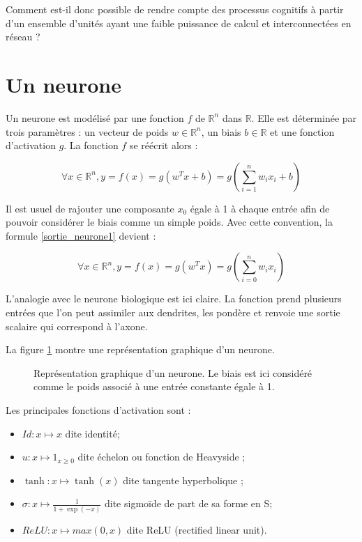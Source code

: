 \documentclass{report}
\begin{document}
Comment est-il donc possible de rendre compte des processus cognitifs à partir d'un ensemble d'unités ayant une faible puissance de calcul et interconnectées en réseau ?

\section{Un neurone}

Un neurone est modélisé par une fonction $f$ de $\mathbb{R}^n$ dans $\mathbb{R}$. Elle est déterminée par trois paramètres : un vecteur de poids $w \in \mathbb{R}^n$, un biais $b \in \mathbb{R}$ et une fonction d'activation $g$. La fonction $f$ se réécrit alors :

\begin{equation}
\forall x \in \mathbb{R}^n, y = f(x) = g(w^Tx+b) = g(\sum_{i=1}^{n}{w_ix_i}+b)
\label{sortie_neurone1}
\end{equation}

Il est usuel de rajouter une composante $x_0$ égale à 1 à chaque entrée afin de pouvoir considérer le biais comme un simple poids. Avec cette convention, la formule \ref{sortie_neurone1} devient :

\begin{equation}
\forall x \in \mathbb{R}^n, y = f(x) = g(w^Tx) = g(\sum_{i=0}^{n}{w_ix_i})
\label{sortie_neurone2}
\end{equation}

L'analogie avec le neurone biologique est ici claire. La fonction prend plusieurs entrées que l'on peut assimiler aux dendrites, les pondère et renvoie une sortie scalaire qui correspond à l'axone.

La figure \ref{neurone} montre une représentation graphique d'un neurone.

\begin{figure}
\begin{center}

\caption{Représentation graphique d'un neurone. Le biais est ici considéré comme le poids associé à une entrée constante égale à 1.}
\label{neurone}
\end{center}
\end{figure}

Les principales fonctions d'activation sont : 

\begin{itemize}
\item $Id : x \mapsto x$ dite identité;
\item $u : x \mapsto 1_{x \geq 0}$ dite échelon ou fonction de Heavyside ;
\item $\tanh : x \mapsto \tanh(x)$ dite tangente hyperbolique ;
\item $\sigma : x \mapsto \frac{1}{1+\exp(-x)}$ dite sigmoïde de part de sa forme en S;
\item $ReLU : x \mapsto max(0, x)$ dite ReLU (rectified linear unit).
\end{itemize}
\end{document}
